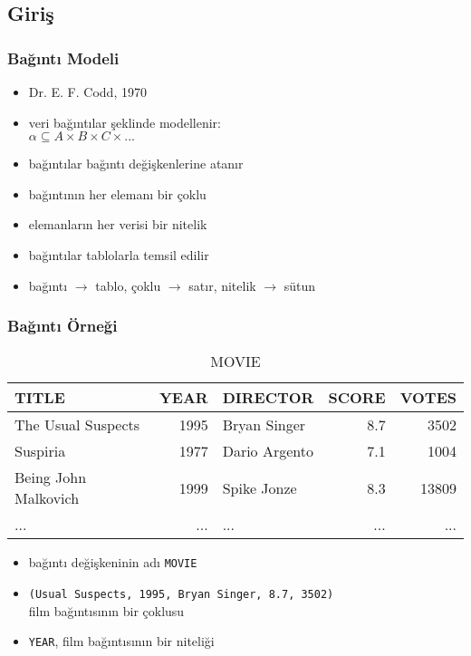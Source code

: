 \documentclass[dvipsnames]{beamer}
\theoremstyle{plain}
\begin{document}
\subsection{Giriş}

\begin{frame}
  \frametitle{Bağıntı Modeli}

  \begin{itemize}
    \item Dr. E. F. Codd, 1970
    \item veri \alert{bağıntılar} şeklinde modellenir:\\
      $\alpha \subseteq A \times B \times C \times ...$

    \pause
    \medskip
    \item bağıntılar \alert{bağıntı değişkenlerine} atanır
    \item bağıntının her elemanı bir \alert{çoklu}
    \item elemanların her verisi bir \alert{nitelik}

    \pause
    \medskip
    \item bağıntılar tablolarla temsil edilir
    \item bağıntı $\rightarrow$ tablo, çoklu $\rightarrow$ satır,
        nitelik $\rightarrow$ sütun
 
  \end{itemize}
\end{frame}

\begin{frame}
  \frametitle{Bağıntı Örneği}

  \begin{footnotesize}
  \begin{table}
    \caption{MOVIE}
    \begin{tabular}{|l|r|l|r|r|}\hline
TITLE                & YEAR & DIRECTOR      & SCORE & VOTES\\\hline\hline
The Usual Suspects   & 1995 & Bryan Singer  &   8.7 &  3502\\\hline
Suspiria             & 1977 & Dario Argento &   7.1 &  1004\\\hline
Being John Malkovich & 1999 & Spike Jonze   &   8.3 & 13809\\\hline
...                  &  ... & ...           &   ... &   ...\\\hline
    \end{tabular}
  \end{table}
  \end{footnotesize}

    \begin{itemize}
      \item bağıntı değişkeninin adı \texttt{MOVIE}
      \item \texttt{(Usual Suspects, 1995, Bryan Singer, 8.7, 3502)}\\
        film bağıntısının bir çoklusu
      \item \texttt{YEAR}, film bağıntısının bir niteliği
    \end{itemize}

\end{frame}
\end{document}
